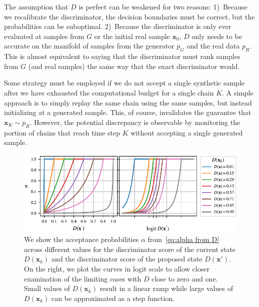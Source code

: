 \documentclass{article}
\renewcommand{\vec}[1]{{\boldsymbol{\mathbf{#1}}}} %
\newcommand{\sample}{\sim}
\newcommand{\PG}{{p_G}}
\newcommand{\PR}{{p_R}}
\newcommand{\accept}{\alpha}
\begin{document}
The assumption that $D$ is perfect can be weakened for two reasons:
1)~Because we recalibrate the discriminator, the decision boundaries must be correct, but the probabilities can be suboptimal.
2)~Because the discriminator is only ever evaluated at samples from $G$ or the initial real sample $\vec x_0$, $D$ only needs to be accurate on the manifold of samples from the generator $\PG$ and the real data $\PR$.
This is almost equivalent to saying that the discriminator must rank samples from $G$ (and real samples) the same way that the exact discriminator would.

Some strategy must be employed if we do not accept a single synthetic sample after we have exhausted the computational budget for a single chain $K$.
A simple approach is to simply replay the same chain using the same samples, but instead initializing at a generated sample.
This, of course, invalidates the guarantee that $\vec x_K \sample \PR$.
However, the potential discrepancy is observable by monitoring the portion of chains that reach time step $K$ without accepting a single generated sample.


\begin{figure}
    \centering
    \includegraphics[width=\textwidth]{figures/alpha2.pdf}
    \caption{{\small
    We show the acceptance probabilities $\accept$ from~\eqref{eq:alpha from D} across different values for the discriminator score of the current state $D(\vec x_k)$ and the discriminator score of the proposed state $D(\vec x')$.
    On the right, we plot the curves in logit scale to allow closer examination of the limiting cases with $D$ close to zero and one.
    Small values of $D(\vec x_k)$ result in a linear ramp while large values of $D(\vec x_k)$ can be approximated as a step function.
    }}
    \label{fig:alpha}
\end{figure}
\end{document}
